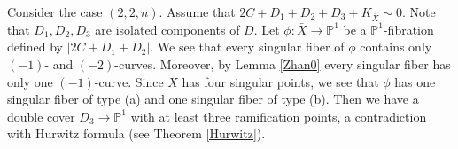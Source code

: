 \documentclass[10pt,oneside,reqno]{amsart}
\newcommand{\pp}{\mathbb{P}}
\theoremstyle{definition}
\theoremstyle{remark}
\numberwithin{equation}{section}
\begin{document}

Consider the case $(2,2,n)$. Assume that $2C+D_1+D_2+D_3+K_{\bar{X}}\sim 0$. Note that $D_1, D_2, D_3$ are isolated components of $D$. Let $\phi\colon\bar{X}\rightarrow\pp^1$ be a $\pp^1$-fibration defined by $|2C+D_1+D_2|$. We see that every singular fiber of $\phi$ contains only $(-1)$- and $(-2)$-curves. Moreover, by Lemma \ref{Zhan0} every singular fiber has only one $(-1)$-curve. Since $X$ has four singular points, we see that $\phi$ has one singular fiber of type (a) and one singular fiber of type (b). Then we have a double cover $D_3\rightarrow\pp^1$ with at least three ramification points, a contradiction with Hurwitz formula
(see Theorem \ref{Hurwitz}).
\end{document}

